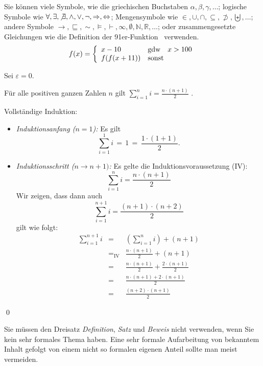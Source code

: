 \documentclass[11pt,a4paper]{report}
\begin{document}
Sie können viele Symbole, wie die griechischen Buchstaben 
$\alpha, \beta, \gamma, \ldots$;
logische Symbole wie $\forall, \exists, \not\exists, \wedge, \vee, \neg,
\Rightarrow, \Leftrightarrow$;
Mengensymbole wie $\in, \cup, \cap, \subseteq, \not\supset, 
\biguplus, \ldots$;
andere Symbole $\rightarrow, \sqsubseteq, \sim, 
\models, \vdash, \infty, \emptyset, \mathbb{N}, \mathbb{R}, \ldots$;
oder zusammengesetzte Gleichungen 
wie die Definition der 91er-Funktion~\cite{manna70}
verwenden.
\[
  f(x) = \left\{ \begin{array}{lll}
      x-10 & \mbox{gdw} & x>100 \\
      f(f(x+11)) & \multicolumn{2}{l}{\mbox{sonst}} 
    \end{array} \right.
\]


\begin{definition}
Sei $\varepsilon = 0$.
\end{definition}

\begin{satz}
Für alle positiven ganzen Zahlen $n$ gilt 
$\sum_{i=1}^n i = \frac{n \cdot (n+1)}{2}$ \enspace.
\end{satz}
\begin{beweis}
Vollständige Induktion:
\begin{itemize}
\item \emph{Induktionsanfang ($n=1$):} Es gilt  
\[
  \sum_{i=1}^1 i \, = \, 1 \, = \, \frac{1 \cdot (1+1)}{2}.
\]
\item \emph{Induktionsschritt ($n \rightarrow n+1)$:}
Es gelte die Induktionsvoraussetzung (IV):
\[
\sum_{i=1}^n i = \frac{n \cdot (n+1)}{2}
\]
Wir zeigen, dass dann auch 
\[
\sum_{i=1}^{n+1} i = \frac{(n+1) \cdot (n+2)}{2}
\]
gilt wie folgt:
\begin{eqnarray*}
  \sum_{i=1}^{n+1} i 
  & = & (\sum_{i=1}^{n} i) + (n+1)  \\
  & =_{\mbox{IV}} & \frac{n \cdot (n+1)}{2} + (n+1) \\
  & = & \frac{n \cdot (n+1)}{2} + \frac{2 \cdot (n+1)}{2} \\
  & = & \frac{n \cdot (n+1) + 2 \cdot (n+1)}{2} \\
  & = & \frac{(n+2) \cdot (n+1)}{2} 
\end{eqnarray*}
\end{itemize}
\qed
\end{beweis}
Sie müssen den Dreisatz 
\emph{Definition}, \emph{Satz} und \emph{Beweis} nicht verwenden, 
wenn Sie kein sehr formales Thema haben. 
Eine sehr formale Aufarbeitung von bekanntem Inhalt gefolgt 
von einem nicht so formalen eigenen Anteil sollte man 
meist vermeiden.
\end{document}
